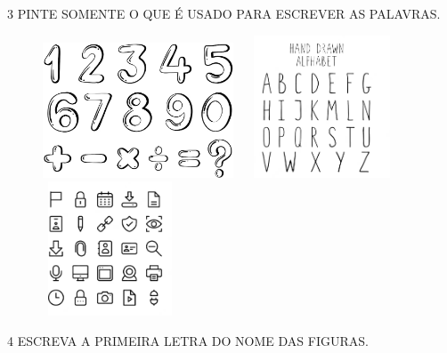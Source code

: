 \num{3} PINTE SOMENTE O QUE É USADO PARA ESCREVER AS PALAVRAS.

\begin{figure}[htpb!]
\includegraphics[width=2.23393in,height=1.58569in]{media/image6.png}
\includegraphics[width=1.96211in,height=1.66818in]{media/image7.png}
\includegraphics[width=1.56875in,height=1.56875in]{media/image8.png}
\end{figure}



\pagebreak
\num{4} ESCREVA A PRIMEIRA LETRA DO NOME DAS FIGURAS.\bigskip


